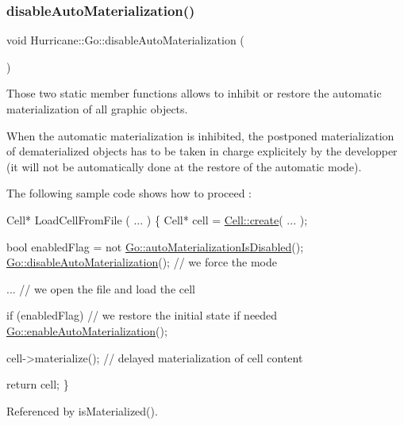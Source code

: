 \subsubsection{\texorpdfstring{disable\+Auto\+Materialization()}{disableAutoMaterialization()}}
{\footnotesize\ttfamily void Hurricane\+::\+Go\+::disable\+Auto\+Materialization (\begin{DoxyParamCaption}{ }\end{DoxyParamCaption})\hspace{0.3cm}{\ttfamily [static]}}

Those two static member functions allows to inhibit or restore the automatic materialization of all graphic objects.

When the automatic materialization is inhibited, the postponed materialization of dematerialized objects has to be taken in charge explicitely by the developper (it will not be automatically done at the restore of the automatic mode).

The following sample code shows how to proceed \+: 
\begin{DoxyCode}
Cell* LoadCellFromFile ( ... )
\{
   Cell* cell = \hyperlink{classHurricane_1_1Cell_ad803afb3e52bea3bf3d520e353b162e0}{Cell::create}( ... );
 
   \textcolor{keywordtype}{bool} enabledFlag = not \hyperlink{classHurricane_1_1Go_a1057be4198a7b64c32a2ac3c7d560014}{Go::autoMaterializationIsDisabled}();
   \hyperlink{classHurricane_1_1Go_a0d49d22a3788e8001e58152e62b9f3cc}{Go::disableAutoMaterialization}(); \textcolor{comment}{// we force the mode}
 
   ... \textcolor{comment}{// we open the file and load the cell }
 
   \textcolor{keywordflow}{if} (enabledFlag) \textcolor{comment}{// we restore the initial state if needed}
     \hyperlink{classHurricane_1_1Go_ab0b1ca3c606247e1ebd7cab8fa828b04}{Go::enableAutoMaterialization}();
 
   cell->materialize(); \textcolor{comment}{// delayed materialization of cell content}
 
   \textcolor{keywordflow}{return} cell;
\}
\end{DoxyCode}
 

Referenced by is\+Materialized().

\mbox{\label{classHurricane_1_1Go_a8251eba8fabfca57f574921c6c85728f}} 
